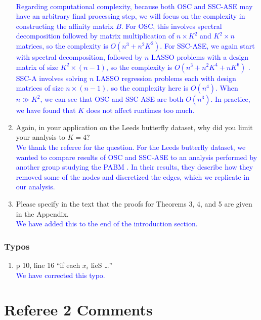 \documentclass[
]{article}
\providecommand{\tightlist}{%
  \setlength{\itemsep}{0pt}\setlength{\parskip}{0pt}}
\begin{document}
\begin{enumerate}
{  }\\
  \textcolor{blue}{
  Regarding computational complexity, because both OSC and SSC-ASE may have an arbitrary final processing step, we will focus on the complexity in constructing the affinity matrix $B$. 
  For OSC, this involves spectral decomposition followed by matrix multiplication of $n \times K^2$ and $K^2 \times n$ matrices, so the complexity is $O(n^3 + n^2 K^2)$. 
  For SSC-ASE, we again start with spectral decomposition, followed by $n$ LASSO problems with a design matrix of size $K^2 \times (n - 1)$, so the complexity is $O(n^3 + n^2 K^4 + n K^6)$ \cite{10.1214/009053604000000067}. 
  SSC-A involves solving $n$ LASSO regression problems each with design matrices of size $n \times (n - 1)$, so the complexity here is $O(n^4)$. 
  When $n \gg K^2$, we can see that OSC and SSC-ASE are both $O(n^3)$. 
  In practice, we have found that $K$ does not affect runtimes too much. 
  }
\item
  Again, in your application on the Leeds butterfly dataset, why did you
  limit your analysis to \(K = 4\)?\\
  \textcolor{blue}{
  We thank the referee for the question. 
  For the Leeds butterfly dataset, we wanted to compare results of OSC and SSC-ASE to an analysis performed by another group studying the PABM \citep{noroozi2019estimation}. 
  In their results, they describe how they removed some of the nodes and discretized the edges, which we replicate in our analysis. 
  }
\item
  Please specify in the text that the proofs for Theorems 3, 4, and 5
  are given in the Appendix.\\
  \textcolor{blue}{
  We have added this to the end of the introduction section.
  }
\end{enumerate}

\hypertarget{typos}{%
\subsubsection{Typos}\label{typos}}

\begin{enumerate}
\def\labelenumi{\arabic{enumi}.}
\tightlist
\item
  p 10, line 16 ``if each \(x_i\) lieS \ldots{}''\\
  \textcolor{blue}{
  We have corrected this typo. 
  }
\end{enumerate}

\hypertarget{referee-2-comments}{%
\section{Referee 2 Comments}\label{referee-2-comments}}
\end{document}
